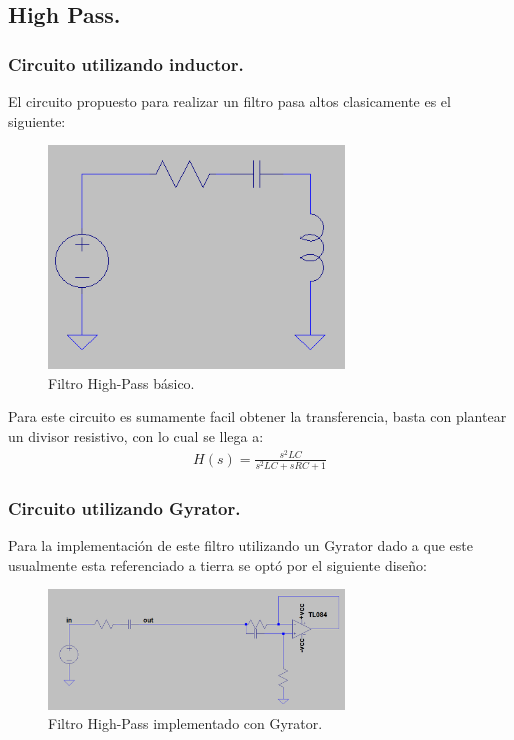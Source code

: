 \documentclass[a4paper]{article}
\begin{document}
\subsection{High Pass.}
\subsubsection{Circuito utilizando inductor.}
El circuito propuesto para realizar un filtro pasa altos clasicamente es el siguiente:
\begin{figure}[H]	
	\centering
	\includegraphics[width=0.7\textwidth]{basicHP.PNG}
	\caption{Filtro High-Pass básico.}
	\label{fig:basHP}
\end{figure}
Para este circuito es sumamente facil obtener la transferencia, basta con plantear un divisor resistivo, con lo cual se llega a:
\begin{align} 
H(s)=\frac{s^2LC}{s^2LC+sRC+1}
 \end{align}

\subsubsection{Circuito utilizando Gyrator.}
Para la implementación de este filtro utilizando un Gyrator dado a que este usualmente esta referenciado a tierra  se optó por el siguiente diseño:
\begin{figure}[H]	
	\centering
	\includegraphics[width=0.7\textwidth]{gyrHP.PNG}
	\caption{Filtro High-Pass implementado con Gyrator.}
	\label{fig:gyrHP}
\end{figure}
\end{document}
